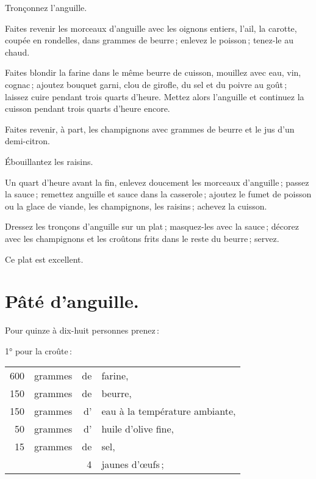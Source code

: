 Tronçonnez l'anguille.

Faites revenir les morceaux d'anguille avec les oignons entiers, l'ail, la
carotte, coupée en rondelles, dans {\mmm} grammes de beurre ; enlevez le poisson ;
tenez-le au chaud.

Faites blondir la farine dans le même beurre de cuisson, mouillez avec eau,
vin, cognac ; ajoutez bouquet garni, clou de girofle, du sel et du poivre au
goût ; laissez cuire pendant trois quarts d'heure. Mettez alors l'anguille et
continuez la cuisson pendant trois quarts d'heure encore.

Faites revenir, à part, les champignons avec {\mmm} grammes de beurre et le jus
d'un demi-citron.

Ébouillantez les raisins.

Un quart d'heure avant la fin, enlevez doucement les morceaux d’anguille ;
passez la sauce ; remettez anguille et sauce dans la casserole ; ajoutez le
fumet de poisson ou la glace de viande, les champignons, les raisins ; achevez
la cuisson.

Dressez les tronçons d'anguille sur un plat ; masquez-les avec la sauce ;
décorez avec les champignons et les croûtons frits dans le reste du beurre ;
servez.

Ce plat est excellent.

\section*{\centering Pâté d'anguille.}

Pour quinze à dix-huit personnes prenez :

\medskip

1° pour la croûte :

\medskip

\footnotesize
\begin{longtable}{rrrp{16em}}
    600 & grammes & de & farine,                                                                          \\
    150 & grammes & de & beurre,                                                                          \\
    150 & grammes & d' & eau à la température ambiante,                                                   \\
     50 & grammes & d' & huile d'olive fine,                                                              \\
     15 & grammes & de & sel,                                                                             \\
        &         &  4 & jaunes d’œufs ;                                                                  \\
\end{longtable}
\normalsize

